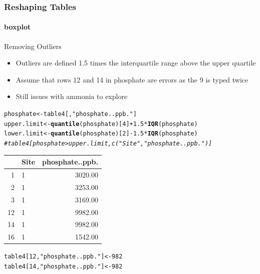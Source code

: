 \documentclass[10pt,handout,english]{beamer}\usepackage[]{graphicx}\usepackage[]{color}
\makeatletter
\newcommand{\hlnum}[1]{\textcolor[rgb]{0.686,0.059,0.569}{#1}}%
\newcommand{\hlstr}[1]{\textcolor[rgb]{0.192,0.494,0.8}{#1}}%
\newcommand{\hlcom}[1]{\textcolor[rgb]{0.678,0.584,0.686}{\textit{#1}}}%
\newcommand{\hlopt}[1]{\textcolor[rgb]{0,0,0}{#1}}%
\newcommand{\hlstd}[1]{\textcolor[rgb]{0.345,0.345,0.345}{#1}}%
\newcommand{\hlkwb}[1]{\textcolor[rgb]{0.69,0.353,0.396}{#1}}%
\newcommand{\hlkwd}[1]{\textcolor[rgb]{0.737,0.353,0.396}{\textbf{#1}}}%
\newenvironment{kframe}{%
 \def\at@end@of@kframe{}%
 \ifinner\ifhmode%
  \def\at@end@of@kframe{\end{minipage}}%
  \begin{minipage}{\columnwidth}%
 \fi\fi%
 \def\FrameCommand##1{\hskip\@totalleftmargin \hskip-\fboxsep
 \colorbox{shadecolor}{##1}\hskip-\fboxsep
     \hskip-\linewidth \hskip-\@totalleftmargin \hskip\columnwidth}%
 \MakeFramed {\advance\hsize-\width
   \@totalleftmargin\z@ \linewidth\hsize
   \@setminipage}}%
 {\par\unskip\endMakeFramed%
 \at@end@of@kframe}
\newenvironment{knitrout}{}{} %
\makeatother
\begin{document}
\begin{frame}[fragile]
  \frametitle{Reshaping Tables}
  \framesubtitle{ boxplot}
  \begin{block}{Removing Outliers}
  \begin{itemize}
  \item Outliers are defined 1.5 times the interquartile range above the upper quartile
  \item Assume that  rows 12 and 14 in phosphate are errors as the 9 is typed twice
  \item Still issues with ammonia to explore
  \end{itemize}
  \end{block}  
\begin{knitrout}
\color{fgcolor}\begin{kframe}
\begin{alltt}
  \hlstd{phosphate}\hlkwb{<-}\hlstd{table4[,}\hlstr{"phosphate..ppb."}\hlstd{]}
  \hlstd{upper.limit} \hlkwb{<-} \hlkwd{quantile}\hlstd{(phosphate)[}\hlnum{4}\hlstd{]} \hlopt{+} \hlnum{1.5}\hlopt{*}\hlkwd{IQR}\hlstd{(phosphate)}
  \hlstd{lower.limit} \hlkwb{<-} \hlkwd{quantile}\hlstd{(phosphate)[}\hlnum{2}\hlstd{]} \hlopt{-} \hlnum{1.5}\hlopt{*}\hlkwd{IQR}\hlstd{(phosphate)}
  \hlcom{#table4[phosphate> upper.limit,c("Site","phosphate..ppb.")]}
\end{alltt}
\end{kframe}
\end{knitrout}
 
\begin{table}[ht]
\centering
\begin{tabular}{rlr}
  \hline
 & Site & phosphate..ppb. \\ 
  \hline
1 & 1 & 3020.00 \\ 
  2 & 1 & 3253.00 \\ 
  3 & 1 & 3169.00 \\ 
  12 & 1 & 9982.00 \\ 
  14 & 1 & 9982.00 \\ 
  16 & 1 & 1542.00 \\ 
   \hline
\end{tabular}
\end{table}

\begin{knitrout}
\color{fgcolor}\begin{kframe}
\begin{alltt}
\hlstd{table4[}\hlnum{12}\hlstd{,}\hlstr{"phosphate..ppb."}\hlstd{]}\hlkwb{<-}\hlnum{982}
\hlstd{table4[}\hlnum{14}\hlstd{,}\hlstr{"phosphate..ppb."}\hlstd{]}\hlkwb{<-}\hlnum{982}
\end{alltt}
\end{kframe}
\end{knitrout}
\end{frame}
\end{document}
